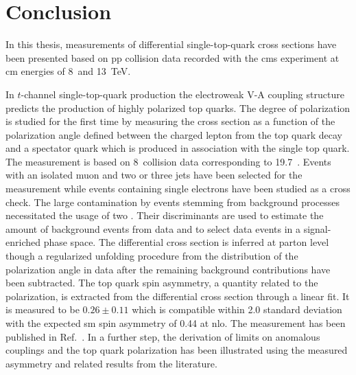 \chapter*{Conclusion}

In this thesis, measurements of differential single-top-quark cross sections have been presented based on \acrlong{pp} collision data recorded with the \gls{cms} experiment at \acrlong{cm} energies of 8~and 13~TeV.


In $t$-channel single-top-quark production the electroweak V-A coupling structure predicts the production of highly polarized top quarks. The degree of polarization is studied for the first time by measuring the cross section as a function of the polarization angle defined between the charged lepton from the top quark decay and a spectator quark which is produced in association with the single top quark. The measurement is based on 8~\TeV collision data corresponding to 19.7~\invfb. Events with an isolated muon and two or three jets have been selected for the measurement while events containing single electrons have been studied as a cross check. The large contamination by events stemming from background processes necessitated the usage of two . Their discriminants are used to estimate the amount of background events from data and to select data events in a signal-enriched phase space. The differential cross section is inferred at parton level though a regularized unfolding procedure from the distribution of the polarization angle in data after the remaining background contributions have been subtracted. The top quark spin asymmetry, a quantity related to the polarization, is extracted from the differential cross section through a linear fit. It is measured to be $0.26\pm 0.11$ which is compatible within 2.0 standard deviation with the expected \gls{sm} spin asymmetry of 0.44 at \gls{nlo}. The measurement has been published in Ref.~\cite{Khachatryan:2015dzz}. In a further step, the derivation of limits on anomalous couplings and the top quark polarization has been illustrated using the measured asymmetry and related results from the literature.

